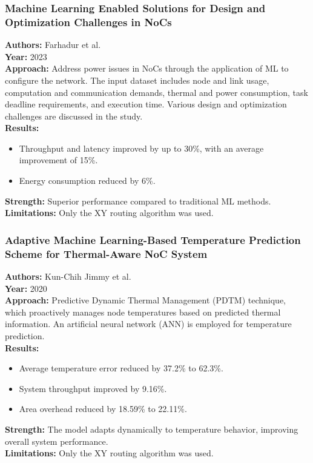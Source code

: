 \documentclass{beamer}
\begin{document}
\begin{frame}
\frametitle{Machine Learning Enabled Solutions for Design and Optimization Challenges in NoCs}

\textbf{Authors:} Farhadur et al. \\
\textbf{Year:} 2023 \\[10pt]

\textbf{Approach:} Address power issues in NoCs through the application of ML to configure the network. The input dataset includes node and link usage, computation and communication demands, thermal and power consumption, task deadline requirements, and execution time. Various design and optimization challenges are discussed in the study. \\[10pt]

\textbf{Results:}
\begin{itemize}
\item Throughput and latency improved by up to 30\%, with an average improvement of 15\%.
\item Energy consumption reduced by 6\%.
\end{itemize}

\textbf{Strength:} Superior performance compared to traditional ML methods. \\[10pt]

\textbf{Limitations:} Only the XY routing algorithm was used.
\end{frame}

\begin{frame}
\frametitle{Adaptive Machine Learning-Based Temperature Prediction Scheme for Thermal-Aware NoC System}

\textbf{Authors:} Kun-Chih Jimmy et al. \\
\textbf{Year:} 2020 \\[10pt]

\textbf{Approach:} Predictive Dynamic Thermal Management (PDTM) technique, which proactively manages node temperatures based on predicted thermal information. An artificial neural network (ANN) is employed for temperature prediction. \\[10pt]

\textbf{Results:}
\begin{itemize}
\item Average temperature error reduced by 37.2\% to 62.3\%.
\item System throughput improved by 9.16\%.
\item Area overhead reduced by 18.59\% to 22.11\%.
\end{itemize}

\textbf{Strength:} The model adapts dynamically to temperature behavior, improving overall system performance. \\[10pt]

\textbf{Limitations:} Only the XY routing algorithm was used.
\end{frame}
\end{document}
